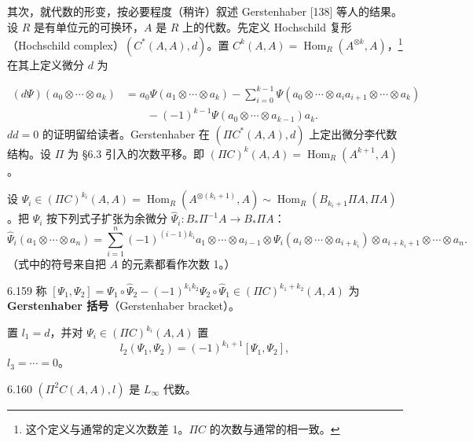 其次，就代数的形变，按必要程度（稍许）叙述 Gerstenhaber [138] 等人的结果。设 $R$ 是有单位元的可换环，$A$ 是 $R$ 上的代数。先定义 Hochschild 复形（Hochschild complex）$(C^*(A,A),d)$。置 $C^k(A,A)=\operatorname{Hom}_R(A^{\otimes k},A)$，\footnote{这个定义与通常的定义次数差 1。$\Pi C$ 的次数与通常的相一致。}在其上定义微分 $d$ 为

\begin{align*}
  (d\Psi)(a_0\otimes\cdots\otimes a_k)
  &=a_0\Psi(a_1\otimes\cdots\otimes a_k)
   -\sum_{i=0}^{k-1}\Psi(a_0\otimes\cdots\otimes a_ia_{i+1}\otimes\cdots\otimes a_k)\\
  &\qquad-(-1)^{k-1}\Psi(a_0\otimes\cdots\otimes a_{k-1})a_k.
\end{align*}
$dd=0$ 的证明留给读者。Gerstenhaber 在 $(\Pi C^*(A,A),d)$ 上定出微分李代数结构。设 $\Pi$ 为 §6.3 引入的次数平移。即 $(\Pi C)^k(A,A)=\operatorname{Hom}_R(A^{k+1},A)$。

设 $\Psi_i\in(\Pi C)^{k_i}(A,A)=\operatorname{Hom}_R(A^{\otimes(k_i+1)},A)\sim\operatorname{Hom}_R(B_{k_i+1}\Pi A,\Pi A)$。把 $\Psi_i$ 按下列式子扩张为余微分 $\hat\Psi_i\colon B_*\Pi^{-1}A\to B_*\Pi A$：
\[
  \hat\Psi_i(a_1\otimes\cdots\otimes a_n)
  =\sum_{i=1}^n(-1)^{(i-1)k_i}a_1\otimes\cdots\otimes a_{i-1}
  \otimes\Psi_i(a_i\otimes\cdots\otimes a_{i+k_i})\otimes a_{i+k_i+1}\otimes\cdots\otimes a_n.
\]
（式中的符号来自把 $A$ 的元素都看作次数 1。）

\begin{definition}{6.159}
  称 $[\Psi_1,\Psi_2]=\Psi_1\circ\hat\Psi_2-(-1)^{k_1k_2}\Psi_2\circ\hat\Psi_1\in(\Pi C)^{k_1+k_2}(A,A)$ 为\textbf{Gerstenhaber 括号}（Gerstenhaber bracket）。
\end{definition}

置 $l_1=d$，并对 $\Psi_i\in(\Pi C)^{k_i}(A,A)$ 置
\[
  l_2(\Psi_1,\Psi_2)=(-1)^{k_1+1}[\Psi_1,\Psi_2],
\]
$l_3=\cdots=0$。

\begin{lemma*}{6.160}
  $(\Pi^2C(A,A),l)$ 是 $L_{\infty}$ 代数。
\end{lemma*}

